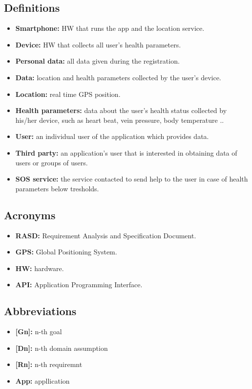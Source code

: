 \subsection{Definitions}
	\begin{itemize}
		\item {\textbf{Smartphone:} HW that runs the app and the location service.}
		\item {\textbf{Device:} HW that collects all user's health parameters.}

		\item {\textbf{Personal data:} all data given during the registration.}
		\item {\textbf{Data:} location and health parameters collected by the user's device.}
		\item {\textbf{Location:} real time GPS position.}
		\item {\textbf{Health parameters:} data about the user's health status collected by his/her device, such as heart beat, 						vein pressure, body temperature ..}

		\item {\textbf{User:} an individual user of the application which provides data.}
		\item {\textbf{Third party:} an application's user that is interested in obtaining data of users or groups of users.} 

		\item{\textbf{SOS service:} the service contacted to send help to the user in case of health parameters below tresholds.}
	\end {itemize}

\subsection{Acronyms}
	\begin{itemize}
		\item {\textbf{RASD:} Requirement Analysis and Specification Document.}
		\item {\textbf{GPS:} Global Positioning System.}
		\item {\textbf{HW:} hardware.}
		\item {\textbf{API:} Application Programming Interface.}
	\end{itemize}

\subsection{Abbreviations }
	\begin{itemize}
		\item {\textbf{[Gn]:} n-th goal}
		\item {\textbf{[Dn]:} n-th domain assumption}
		\item {\textbf{[Rn]:} n-th requiremnt}
		\item{\textbf{App:} appllication}
	\end{itemize}


